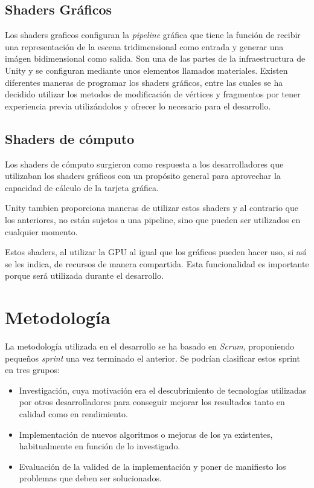 \subsection{Shaders Gráficos}
Los shaders graficos configuran la \textit{pipeline} gráfica que tiene la función de recibir una representación de la escena tridimensional como entrada y generar una imágen bidimensional como salida. 
Son una de las partes de la infraestructura de Unity y se configuran mediante unos elementos llamados materiales. Existen diferentes maneras de programar los shaders gráficos, entre las cuales se ha decidido utilizar los metodos de modificación de vértices y fragmentos por tener experiencia previa utilizándolos y ofrecer lo necesario para el desarrollo.

\subsection{Shaders de cómputo}
Los shaders de cómputo surgieron como respuesta a los desarrolladores que utilizaban los shaders gráficos con un propósito general para aprovechar la capacidad de cálculo de la tarjeta gráfica.

Unity tambien proporciona maneras de utilizar estos shaders y al contrario que los anteriores, no están sujetos a una pipeline, sino que pueden ser utilizados en cualquier momento.

Estos shaders, al utilizar la GPU al igual que los gráficos pueden hacer uso, si así se les indica, de recursos de manera compartida. Esta funcionalidad es importante porque será utilizada durante el desarrollo.


\section{Metodología}
La metodología utilizada en el desarrollo se ha basado en \textit{Scrum}, proponiendo pequeños \textit{sprint} una vez terminado el anterior. Se podrían clasificar estos sprint en tres grupos:

\begin{itemize}
\item Investigación, cuya motivación era el descubrimiento de tecnologías utilizadas por otros desarrolladores para conseguir mejorar los resultados tanto en calidad como en rendimiento.
\item Implementación de nuevos algoritmos o mejoras de los ya existentes, habitualmente en función de lo investigado.
\item Evaluación de la valided de la implementación y poner de manifiesto los problemas que deben ser solucionados.
\end{itemize}

